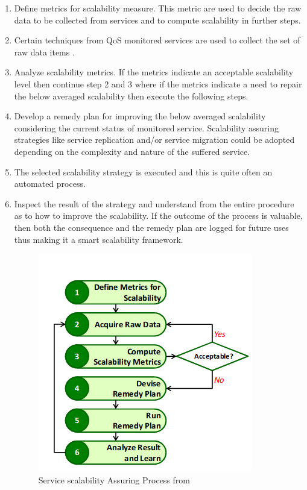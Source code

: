 \begin{enumerate}
	

\item Define metrics for scalability measure. This metric are used to decide the raw data to be collected from services and to compute scalability in further steps.

\item Certain techniques from QoS monitored services are used to collect the set of raw data items \cite{Artaiam2008EnhancingSQ} \cite{hutchison_monitoring_2007}.

\item Analyze scalability metrics. If the metrics indicate an acceptable scalability level then continue step 2 and 3 where if the metrics indicate a need to repair the below averaged scalability then execute the following steps. 

\item Develop a remedy plan for improving the below averaged scalability considering the current status of monitored service. Scalability assuring strategies like service replication and/or service migration could be adopted depending on the complexity and nature of the suffered service. 

\item The selected scalability strategy is executed and this is quite often an automated process. 

\item Inspect the result of the strategy and understand from the entire procedure as to how to improve the scalability. If the outcome of the process is valuable, then both the consequence and the remedy plan are logged for future uses thus making it a smart scalability framework.


\begin{figure}[h]
	\centering
	\includegraphics[width=0.7\linewidth]{figures/ServiceScalability}
	\caption{Service scalability Assuring Process from \cite{lee_software_2010}}
	\label{fig:servicescalability}
\end{figure}

\end{enumerate}

